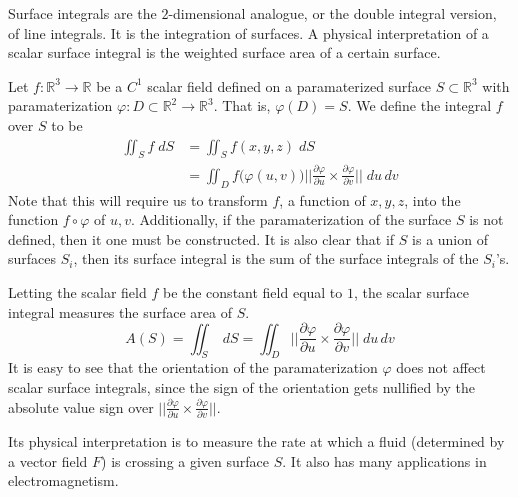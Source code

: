   Surface integrals are the $2$-dimensional analogue, or the double integral version, of line integrals. It is the integration of surfaces. A physical interpretation of a scalar surface integral is the weighted surface area of a certain surface. 
		
  \begin{definition}
		Let $f: \mathbb{R}^3 \to \mathbb{R}$ be a $C^1$ scalar field defined on a paramaterized surface $S \subset \mathbb{R}^3$ with paramaterization $\varphi: D \subset \mathbb{R}^2 \to \mathbb{R}^3$. That is, $\varphi(D) = S$. We define the integral $f$ over $S$ to be
		\begin{align}
			\iint_S f \; dS & = \iint_S f(x, y, z) \; dS \\
			& = \iint_D f\big( \varphi(u, v)\big) \bigg|\bigg|\frac{\partial \varphi}{\partial u} \times \frac{\partial \varphi}{\partial v}\bigg|\bigg| \; du \,dv
		\end{align}
		Note that this will require us to transform $f$, a function of $x, y, z$, into the function $f \circ \varphi$ of $u, v$. Additionally, if the paramaterization of the surface $S$ is not defined, then it one must be constructed. It is also clear that if $S$ is a union of surfaces $S_i$, then its surface integral is the sum of the surface integrals of the $S_i$'s. 
  \end{definition}
		
  Letting the scalar field $f$ be the constant field equal to $1$, the scalar surface integral measures the surface area of $S$. 
  \[A(S) = \iint_S \; dS = \iint_D \Big|\Big|\frac{\partial \varphi}{\partial u} \times \frac{\partial \varphi}{\partial v}\Big|\Big| \; du\, dv\]
  It is easy to see that the orientation of the paramaterization $\varphi$ does not affect scalar surface integrals, since the sign of the orientation gets nullified by the absolute value sign over $||\frac{\partial \varphi}{\partial u} \times \frac{\partial \varphi}{\partial v}||$. 
		
  Its physical interpretation is to measure the rate at which a fluid (determined by a vector field $F$) is crossing a given surface $S$. It also has many applications in electromagnetism. 
		
